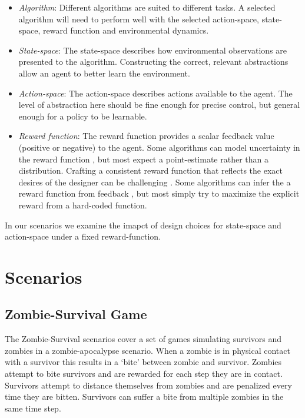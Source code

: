 \documentclass[11pt,a4paper]{article}
\begin{document}
\begin{itemize}
  \item \emph{Algorithm}: Different algorithms are suited to different tasks. A selected algorithm will need to perform well with the selected action-space, state-space, reward function and environmental dynamics.
  \item \emph{State-space}: The state-space describes how environmental observations are presented to the algorithm. Constructing the correct, relevant abstractions allow an agent to better learn the environment.
  \item \emph{Action-space}: The action-space describes actions available to the agent. The level of abstraction here should be fine enough for precise control, but general enough for a policy to be learnable.
  \item \emph{Reward function}: The reward function provides a scalar feedback value (positive or negative) to the agent. Some algorithms can model uncertainty in the reward function \citep{ghavamzadeh2016bayesian}, but most expect a point-estimate rather than a distribution. Crafting a consistent reward function that reflects the exact desires of the designer can be challenging \citep{leike2017ai}. Some algorithms can infer the a reward function from feedback \citep{ng2000algorithms}, but most simply try to maximize the explicit reward from a hard-coded function.
\end{itemize}

In our scenarios we examine the imapct of design choices for state-space and action-space under a fixed reward-function.

\section{Scenarios}
\label{sec:scenarios}

\subsection{Zombie-Survival Game}
\label{sec:game}

The Zombie-Survival scenarios cover a set of games simulating survivors and zombies in a zombie-apocalypse scenario.
When a zombie is in physical contact with a survivor this results in a `bite' between zombie and survivor.
Zombies attempt to bite survivors and are rewarded for each step they are in contact.
Survivors attempt to distance themselves from zombies and are penalized every time they are bitten.
Survivors can suffer a bite from multiple zombies in the same time step.
\end{document}
